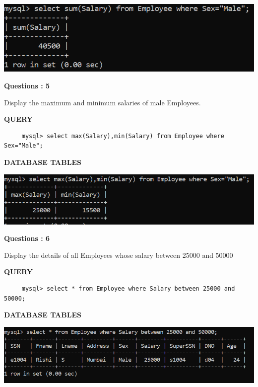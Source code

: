 \documentclass[a4paper,12pt]{report}
\begin{document}
\includegraphics[scale=0.6]{Screenshot (464).png}
\begin{flushleft}
    \textbf{Questions : 5}
\end{flushleft}
Display the maximum and minimum salaries of male Employees.
	\begin{flushleft}
		\textbf{QUERY }
	\end{flushleft}
 \begin{verbatim}
     mysql> select max(Salary),min(Salary) from Employee where Sex="Male";
 \end{verbatim}
\begin{flushleft}
		\textbf{DATABASE TABLES} 
\end{flushleft} 

\includegraphics[scale=0.6]{Screenshot (465).png}

\begin{flushleft}
    \textbf{Questions : 6}
\end{flushleft}
Display the details of all Employees whose salary between 25000 and 50000
	\begin{flushleft}
		\textbf{QUERY }
	\end{flushleft}
 \begin{verbatim}
     mysql> select * from Employee where Salary between 25000 and 50000;
 \end{verbatim}
\begin{flushleft}
		\textbf{DATABASE TABLES} 
\end{flushleft} 

\includegraphics[scale=0.6]{Screenshot (466).png}
\end{document}
